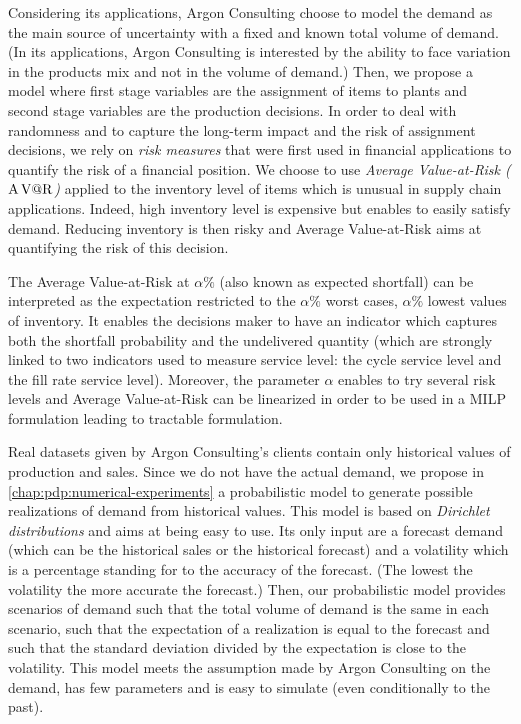 \medskip


Considering its applications, Argon Consulting choose to model the demand as the main source of uncertainty with a fixed and known total volume of demand.
(In its applications, Argon Consulting is interested by the ability to face variation in the products mix and not in the volume of demand.)
Then, we propose a model where first stage variables are the assignment of items to plants and second stage variables are the production decisions.
In order to deal with randomness and to capture the long-term impact and the risk of assignment decisions, we rely on \emph{risk measures} that were first used in financial applications to quantify the risk of a financial position.
We choose to use \emph{Average Value-at-Risk ($\operatorname{A\operatorname{V@R}}$)} applied to the inventory level of items which is unusual in supply chain applications.
Indeed, high inventory level is expensive but enables to easily satisfy demand.
Reducing inventory is then risky and Average Value-at-Risk aims at quantifying the risk of this decision.


The Average Value-at-Risk at $\alpha\%$ (also known as expected shortfall) can be interpreted as the expectation restricted to the $\alpha\%$ worst cases, \ie $\alpha\%$ lowest values of inventory.
It enables the decisions maker to have an indicator which captures both the shortfall probability and the undelivered quantity (which are strongly linked to two indicators used to measure service level: the cycle service level and the fill rate service level).
Moreover, the parameter $\alpha$ enables to try several risk levels and Average Value-at-Risk can be linearized in order to be used in a MILP formulation leading to tractable formulation.


\medskip


Real datasets given by Argon Consulting's clients contain only historical values of production and sales.
Since we do not have the actual demand, we propose in \cref{chap:pdp:numerical-experiments} a probabilistic model to generate possible realizations of demand from historical values.
This model is based on \emph{Dirichlet distributions} and aims at being easy to use.
Its only input are a forecast demand (which can be the historical sales or the historical forecast) and a volatility which is a percentage standing for to the accuracy of the forecast.
(The lowest the volatility the more accurate the forecast.)
Then, our probabilistic model provides scenarios of demand such that the total volume of demand is the same in each scenario, such that the expectation of a realization is equal to the forecast and such that the standard deviation divided by the expectation is close to the volatility.
This model meets the assumption made by Argon Consulting on the demand, has few parameters and is easy to simulate (even conditionally to the past).


